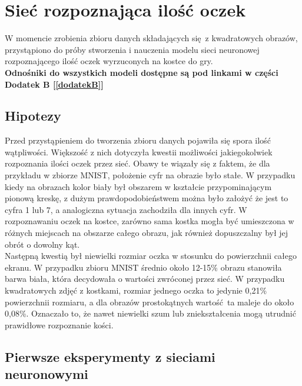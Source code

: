 
\chapter{Sieć rozpoznająca ilość oczek}
W momencie zrobienia zbioru danych składających się z kwadratowych obrazów, przystąpiono
do próby stworzenia i nauczenia modelu sieci neuronowej rozpoznającego ilość oczek
wyrzuconych na kostce do gry.\\
\textbf{Odnośniki do wszystkich modeli dostępne są pod linkami w części Dodatek B [\ref{dodatekB}] }

\section{Hipotezy}
Przed przystąpieniem do tworzenia zbioru danych pojawiła się spora ilość wątpliwości.
Większość z nich dotyczyła kwestii możliwości jakiegokolwiek rozpoznania ilości oczek
przez sieć. Obawy te wiązały się z faktem, że dla przykładu
w zbiorze MNIST, położenie cyfr na obrazie było stałe. W przypadku kiedy na obrazach
kolor biały był obszarem w kształcie przypominającym pionową kreskę, z dużym
prawdopodobieństwem można było założyć że jest to cyfra 1 lub 7, a analogiczna
sytuacja zachodziła dla innych cyfr. W rozpoznawaniu oczek na kostce, zarówno sama
kostka mogła być umieszczona w różnych miejscach na obszarze całego obrazu, jak również
dopuszczalny był jej obrót o dowolny kąt.\\
Następną kwestią był niewielki rozmiar oczka w stosunku do powierzchnii całego ekranu.
W przypadku zbioru MNIST średnio około 12-15\% obrazu stanowiła barwa biała, która
decydowała o wartości zwróconej przez sieć. W przypadku kwadratowych zdjęć z kostkami,
rozmiar jednego oczka to jedynie 0,21\% powierzchnii rozmiaru, a dla obrazów prostokątnych
wartość ta maleje do około 0,08\%. Oznaczało to, że nawet niewielki szum lub
zniekształcenia mogą utrudnić prawidłowe rozpoznanie kości.

\section{Pierwsze eksperymenty z sieciami neuronowymi}
